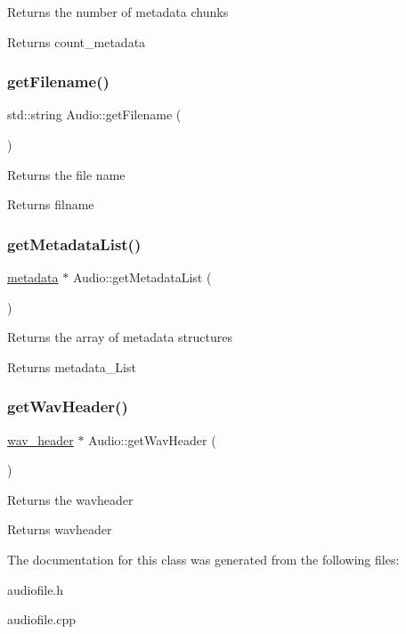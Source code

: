 Returns the number of metadata chunks \begin{DoxyReturn}{Returns}
count\+\_\+metadata 
\end{DoxyReturn}
\mbox{\label{classAudio_a33b723e5b540b84b1d7fcd59d0eee567}} 
\subsubsection{\texorpdfstring{get\+Filename()}{getFilename()}}
{\footnotesize\ttfamily std\+::string Audio\+::get\+Filename (\begin{DoxyParamCaption}{ }\end{DoxyParamCaption})}

Returns the file name \begin{DoxyReturn}{Returns}
filname 
\end{DoxyReturn}
\mbox{\label{classAudio_a6da23521eb58061da65ac88823b875e6}} 
\subsubsection{\texorpdfstring{get\+Metadata\+List()}{getMetadataList()}}
{\footnotesize\ttfamily \hyperlink{structmetadata}{metadata} $\ast$ Audio\+::get\+Metadata\+List (\begin{DoxyParamCaption}{ }\end{DoxyParamCaption})}

Returns the array of metadata structures \begin{DoxyReturn}{Returns}
metadata\+\_\+\+List 
\end{DoxyReturn}
\mbox{\label{classAudio_ac0c6115c2102ec602cdc99dc9929fb86}} 
\subsubsection{\texorpdfstring{get\+Wav\+Header()}{getWavHeader()}}
{\footnotesize\ttfamily \hyperlink{structwav__header}{wav\+\_\+header} $\ast$ Audio\+::get\+Wav\+Header (\begin{DoxyParamCaption}{ }\end{DoxyParamCaption})}

Returns the wavheader \begin{DoxyReturn}{Returns}
wavheader 
\end{DoxyReturn}


The documentation for this class was generated from the following files\+:\begin{DoxyCompactItemize}
\item 
audiofile.\+h\item 
audiofile.\+cpp\end{DoxyCompactItemize}
